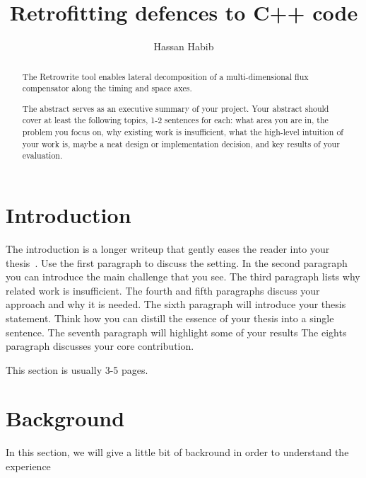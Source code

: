 \documentclass[a4paper,11pt,oneside]{report}
\title{Retrofitting defences to C++ code}
\author{Hassan Habib}
\newcommand{\sysname}{Retrowrite\xspace}
\begin{document}
\maketitle

\begin{abstract}
The \sysname tool enables lateral decomposition of a multi-dimensional
flux compensator along the timing and space axes.

The abstract serves as an executive summary of your project.
Your abstract should cover at least the following topics, 1-2 sentences for
each: what area you are in, the problem you focus on, why existing work is
insufficient, what the high-level intuition of your work is, maybe a neat
design or implementation decision, and key results of your evaluation.

\end{abstract}


\maketoc

\chapter{Introduction}

The introduction is a longer writeup that gently eases the reader into your
thesis~\cite{dinesh20oakland}. Use the first paragraph to discuss the setting.
In the second paragraph you can introduce the main challenge that you see.
The third paragraph lists why related work is insufficient.
The fourth and fifth paragraphs discuss your approach and why it is needed.
The sixth paragraph will introduce your thesis statement. Think how you can
distill the essence of your thesis into a single sentence.
The seventh paragraph will highlight some of your results
The eights paragraph discusses your core contribution.

This section is usually 3-5 pages.

\chapter{Background}
In this section, we will give a little bit of backround in order to understand
the experience
\end{document}
